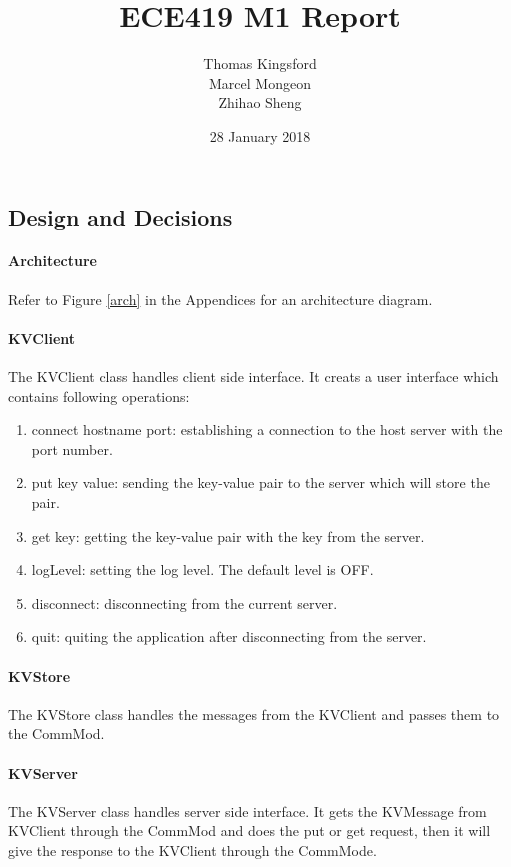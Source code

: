 \documentclass[10pt]{article}
\title{ECE419 M1 Report}
\date{28 January 2018}
\author{Thomas Kingsford\\Marcel Mongeon\\Zhihao Sheng}
\begin{document}
\begin{multicols}{2}
\maketitle

\section{Design and Decisions}

\paragraph{Architecture} Refer to Figure \ref{arch} in the Appendices for an architecture diagram.

\paragraph{KVClient} The KVClient class handles client side interface. It creats a user interface which contains following operations:

\begin{enumerate}
    \item connect hostname port: establishing a connection to the host server with the port number.
    \item put key value: sending the key-value pair to the server which will store the pair.
    \item get key: getting the key-value pair with the key from the server.
    \item logLevel: setting the log level. The default level is OFF.
    \item disconnect: disconnecting from the current server.
    \item quit: quiting the application after disconnecting from the server.
\end{enumerate}

\paragraph{KVStore} The KVStore class handles the messages from the KVClient and passes them to the CommMod.

\paragraph{KVServer} The KVServer class handles server side interface. It gets the KVMessage from KVClient through the CommMod and does the put or get request, then it will give the response to the KVClient through the CommMode.


\end{multicols}
\end{document}
